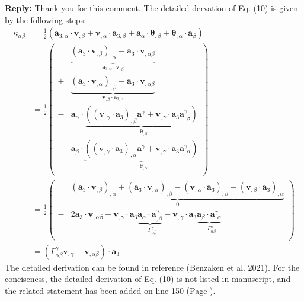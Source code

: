 \documentclass{article}
\begin{document}
\textbf{Reply:} Thank you for this comment. The detailed dervation of Eq. (10) is given by the following steps:
\begin{equation}
    \begin{split}
        \kappa_{\alpha\beta} &=\frac{1}{2}(\boldsymbol a_{3,\alpha} \cdot \boldsymbol v_{,\beta} + \boldsymbol v_{,\alpha} \cdot \boldsymbol a_{3,\beta} + \boldsymbol a_\alpha \cdot \boldsymbol \theta_{,\beta} + \boldsymbol \theta_{,\alpha} \cdot \boldsymbol a_\beta) \\
        &=\frac{1}{2} \left ( 
        \begin{split}
            &\underbrace{(\boldsymbol a_3 \cdot \boldsymbol v_{,\beta})_{,\alpha} - \boldsymbol a_3 \cdot \boldsymbol v_{,\alpha\beta}}_{\boldsymbol a_{3,\alpha} \cdot \boldsymbol v_{,\beta}} \\
            +&\underbrace{(\boldsymbol a_3 \cdot \boldsymbol v_{,\alpha})_{,\beta} - \boldsymbol a_3 \cdot \boldsymbol v_{,\alpha\beta}}_{\boldsymbol v_{,\beta} \cdot \boldsymbol a_{3,\alpha}} \\
            -& \boldsymbol a_\alpha \cdot \underbrace{((\boldsymbol v_{,\gamma} \cdot \boldsymbol a_3)_{,\beta} \boldsymbol a^\gamma + \boldsymbol v_{,\gamma} \cdot \boldsymbol a_3 \boldsymbol a^\gamma_{,\beta})}_{-\boldsymbol \theta_{,\beta}} \\
            -& \boldsymbol a_\beta \cdot \underbrace{((\boldsymbol v_{,\gamma} \cdot \boldsymbol a_3)_{,\alpha} \boldsymbol a^\gamma + \boldsymbol v_{,\gamma} \cdot \boldsymbol a_3 \boldsymbol a^\gamma_{,\alpha})}_{-\boldsymbol \theta_{,\alpha}} \\
        \end{split}
        \right ) \\
        &=\frac{1}{2} \left ( 
        \begin{split}
            &\underbrace{(\boldsymbol a_3 \cdot \boldsymbol v_{,\beta})_{,\alpha}
            +(\boldsymbol a_3 \cdot \boldsymbol v_{,\alpha})_{,\beta}
            -(\boldsymbol v_{,\alpha} \cdot \boldsymbol a_3)_{,\beta}
            -(\boldsymbol v_{,\beta} \cdot \boldsymbol a_3)_{,\alpha}}_{0} \\
            -&2\boldsymbol a_3 \cdot \boldsymbol v_{,\alpha\beta}
            - \boldsymbol v_{,\gamma} \cdot \boldsymbol a_3 \underbrace{\boldsymbol a_\alpha \cdot \boldsymbol a^\gamma_{,\beta}}_{-\Gamma_{\alpha\beta}^\gamma}
            - \boldsymbol v_{,\gamma} \cdot \boldsymbol a_3 \underbrace{\boldsymbol a_\beta \cdot \boldsymbol a^\gamma_{,\alpha}}_{-\Gamma_{\alpha\beta}^\gamma} \\
        \end{split}
        \right ) \\
        &= (\Gamma_{\alpha\beta}^\gamma \boldsymbol v_{,\gamma} - \boldsymbol v_{,\alpha\beta}) \cdot \boldsymbol a_3
    \end{split}
\end{equation}
The detailed derivation can be found in reference (Benzaken et al. 2021). For the conciseness, the detailed derivation of Eq. (10) is not listed in manuscript, and the related statement has been added on line 150 (Page ).
\end{document}
